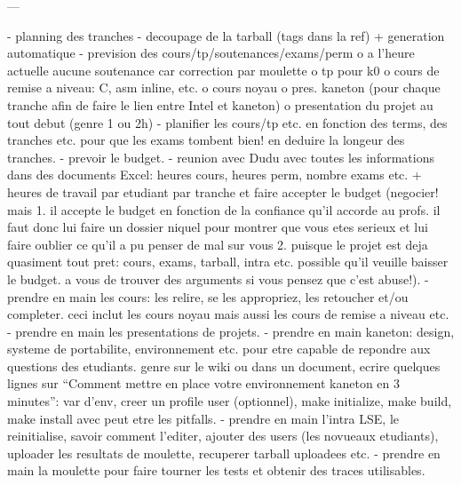 ---

- planning des tranches
- decoupage de la tarball (tags dans la ref) + generation automatique
- prevision des cours/tp/soutenances/exams/perm
    o a l'heure actuelle aucune soutenance car correction par moulette
    o tp pour k0
    o cours de remise a niveau: C, asm inline, etc.
    o cours noyau
    o pres. kaneton (pour chaque tranche afin de faire le lien entre Intel
                     et kaneton)
    o presentation du projet au tout debut (genre 1 ou 2h)
- planifier les cours/tp etc. en fonction des terms, des tranches etc.
  pour que les exams tombent bien! en deduire la longeur des tranches.
- prevoir le budget.
- reunion avec Dudu avec toutes les informations dans des documents Excel:
  heures cours, heures perm, nombre exams etc. + heures de travail par etudiant
  par tranche et faire accepter le budget (negocier! mais 1. il accepte le
  budget en fonction de la confiance qu'il accorde au profs. il faut donc
  lui faire un dossier niquel pour montrer que vous etes serieux et lui
  faire oublier ce qu'il a pu penser de mal sur vous 2. puisque le projet
  est deja quasiment tout pret: cours, exams, tarball, intra etc. possible
  qu'il veuille baisser le budget. a vous de trouver des arguments si vous
  pensez que c'est abuse!).
- prendre en main les cours: les relire, se les appropriez, les retoucher
  et/ou completer. ceci inclut les cours noyau mais aussi les cours de remise
  a niveau etc.
- prendre en main les presentations de projets.
- prendre en main kaneton: design, systeme de portabilite, environnement etc.
  pour etre capable de repondre aux questions des etudiants.
  genre sur le wiki ou dans un document, ecrire quelques lignes sur ``Comment
  mettre en place votre environnement kaneton en 3 minutes'': var d'env,
  creer un profile user (optionnel), make initialize, make build, make install
  avec peut etre les pitfalls.
- prendre en main l'intra LSE, le reinitialise, savoir comment l'editer,
  ajouter des users (les novueaux etudiants), uploader les resultats de
  moulette, recuperer tarball uploadees etc.
- prendre en main la moulette pour faire tourner les tests et obtenir des
  traces utilisables.
